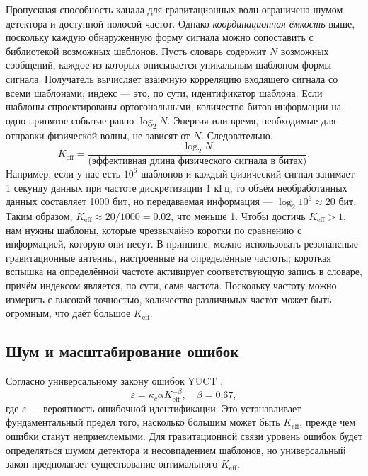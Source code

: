 \documentclass[12pt,a4paper]{article}
\newcommand{\Keff}{K_{\mathrm{eff}}}
\newcommand{\kappac}{\kappa_c}
\newcommand{\eps}{\varepsilon}
\begin{document}
	Пропускная способность канала для гравитационных волн ограничена шумом детектора и доступной полосой частот. Однако \emph{координационная ёмкость} выше, поскольку каждую обнаруженную форму сигнала можно сопоставить с библиотекой возможных шаблонов. Пусть словарь содержит \(N\) возможных сообщений, каждое из которых описывается уникальным шаблоном формы сигнала. Получатель вычисляет взаимную корреляцию входящего сигнала со всеми шаблонами; индекс — это, по сути, идентификатор шаблона. Если шаблоны спроектированы ортогональными, количество битов информации на одно принятое событие равно \(\log_2 N\). Энергия или время, необходимые для отправки физической волны, не зависят от \(N\). Следовательно,
	\begin{equation}
		\Keff = \frac{\log_2 N}{\text{(эффективная длина физического сигнала в битах)}}.
	\end{equation}
	Например, если у нас есть \(10^6\) шаблонов и каждый физический сигнал занимает 1 секунду данных при частоте дискретизации 1 кГц, то объём необработанных данных составляет 1000 бит, но передаваемая информация — \(\log_2 10^6 \approx 20\) бит. Таким образом, \(\Keff \approx 20/1000 = 0.02\), что меньше 1. Чтобы достичь \(\Keff > 1\), нам нужны шаблоны, которые чрезвычайно коротки по сравнению с информацией, которую они несут. В принципе, можно использовать резонансные гравитационные антенны, настроенные на определённые частоты; короткая вспышка на определённой частоте активирует соответствующую запись в словаре, причём индексом является, по сути, сама частота. Поскольку частоту можно измерить с высокой точностью, количество различимых частот может быть огромным, что даёт большое \(\Keff\).
	
	\subsection{Шум и масштабирование ошибок}
	
	Согласно универсальному закону ошибок YUCT \cite{AppendixL},
	\begin{equation}
		\eps = \kappac \alpha \Keff^{-\beta}, \quad \beta = 0.67,
		\label{eq:universal-scaling}
	\end{equation}
	где \(\eps\) — вероятность ошибочной идентификации. Это устанавливает фундаментальный предел того, насколько большим может быть \(\Keff\), прежде чем ошибки станут неприемлемыми. Для гравитационной связи уровень ошибок будет определяться шумом детектора и несовпадением шаблонов, но универсальный закон предполагает существование оптимального \(\Keff\).
	
\end{document}
